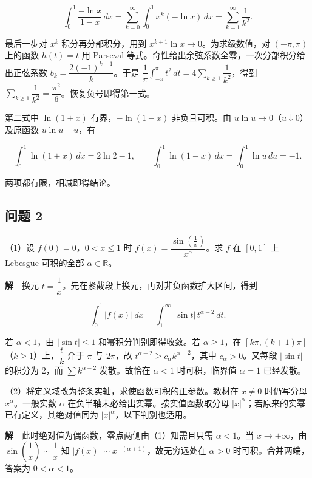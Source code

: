 \documentclass[11pt,a4paper]{article}
\begin{document}
\begin{equation*}
\int_0^1\frac{-\ln x}{1-x}\,dx
=\sum_{k=0}^{\infty}\int_0^1x^k(-\ln x)\,dx
=\sum_{k=1}^{\infty}\frac1{k^2}.
\end{equation*}

最后一步对 \(x^k\) 积分再分部积分，用到
\(x^{k+1}\ln x\to0\)。为求级数值，对 \((-\pi,\pi)\) 上的函数 \(h(t)=t\)
用 Parseval 等式。奇性给出余弦系数全零，一次分部积分给出正弦系数
\(b_k=\dfrac{2(-1)^{k+1}}k\)。于是
\(\dfrac1\pi\int_{-\pi}^{\pi}t^2\,dt=4\sum_{k\ge1}\dfrac1{k^2}\)，得到
\(\sum_{k\ge1}\dfrac1{k^2}=\dfrac{\pi^2}{6}\)。恢复负号即得第一式。

第二式中 \(\ln(1+x)\) 有界，\(-\ln(1-x)\) 非负且可积。由
\(u\ln u\to0\)（\(u\downarrow0\)）及原函数 \(u\ln u-u\)，有

\begin{equation*}
\int_0^1\ln(1+x)\,dx=2\ln2-1,\qquad
\int_0^1\ln(1-x)\,dx=\int_0^1\ln u\,du=-1 .
\end{equation*}

两项都有限，相减即得结论。

\subsection{问题 2}\label{ux95eeux9898-2}

（1）设 \(f(0)=0\)，\(0<x\le1\) 时
\(f(x)=\dfrac{\sin(\frac1x)}{x^\alpha}\)。求 \(f\) 在 \([0,1]\) 上
Lebesgue 可积的全部 \(\alpha\in\mathbb R\)。

\textbf{解}　换元
\(t=\dfrac1x\)。先在紧截段上换元，再对非负函数扩大区间，得到

\begin{equation*}
\int_0^1 |f(x)|\,dx=\int_1^\infty |\sin t|\,t^{\alpha-2}\,dt.
\end{equation*}

若 \(\alpha<1\)，由 \(|\sin t|\le1\) 和幂积分判别即得收敛。若
\(\alpha\ge1\)，在 \([k\pi,(k+1)\pi]\)（\(k\ge1\)）上，\(\dfrac tk\)
介于 \(\pi\) 与 \(2\pi\)，故
\(t^{\alpha-2}\ge c_\alpha k^{\alpha-2}\)，其中 \(c_\alpha>0\)。又每段
\(|\sin t|\) 的积分为 \(2\)，而 \(\sum k^{\alpha-2}\) 发散。故恰在
\(\alpha<1\) 时可积，临界值 \(\alpha=1\) 已经发散。

（2）将定义域改为整条实轴，求使函数可积的正参数。教材在 \(x\ne0\)
时仍写分母 \(x^\alpha\)。一般实数 \(\alpha\)
在负半轴未必给出实幂。按实值函数取分母
\(|x|^\alpha\)；若原来的实幂已有定义，其绝对值同为
\(|x|^\alpha\)，以下判别也适用。

\textbf{解}　此时绝对值为偶函数，零点两侧由（1）知需且只需
\(\alpha<1\)。当 \(x\to+\infty\)，由 \(\sin(\dfrac1x)\sim\dfrac1x\) 知
\(|f(x)|\sim x^{-(\alpha+1)}\)，故无穷远处在 \(\alpha>0\)
时可积。合并两端，答案为 \(0<\alpha<1\)。
\end{document}
